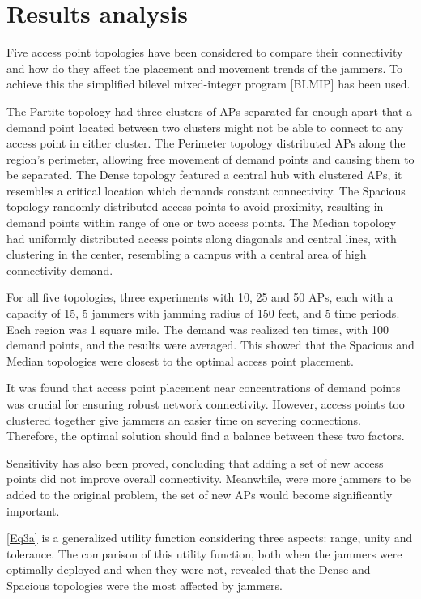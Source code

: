 \documentclass[runningheads]{llncs}
\begin{document}
\section{Results analysis}
	
	Five access point topologies have been considered to compare their connectivity and how do they affect the placement and movement trends of the jammers. To achieve this the simplified bilevel mixed-integer program [BLMIP] has been used.
	
	The Partite topology had three clusters of APs separated far enough apart that a demand point located between two clusters might not be able to connect to any access point in either cluster. The Perimeter topology distributed APs along the region's perimeter, allowing free movement of demand points and causing them to be separated. The Dense topology featured a central hub with clustered APs, it resembles a critical location which demands constant connectivity. The Spacious topology randomly distributed access points to avoid proximity, resulting in demand points within range of one or two access points. The Median topology had uniformly distributed access points along diagonals and central lines, with clustering in the center, resembling a campus with a central area of high connectivity demand.
	

	For all five topologies, three experiments with 10, 25 and 50 APs, each with a capacity of 15, 5 jammers with jamming radius of 150 feet, and 5 time periods. Each region was 1 square mile. The demand was realized ten times, with 100 demand points, and the results were averaged. This showed that the Spacious and Median topologies were closest to the optimal access point placement.
	
	It was found that access point placement near concentrations of demand points was crucial for ensuring robust network connectivity. However, access points too clustered together give jammers an easier time on severing connections. Therefore, the optimal solution should find a balance between these two factors. 
	
	Sensitivity has also been proved, concluding that adding a set of new access points did not improve overall connectivity. Meanwhile, were more jammers to be added to the original problem, the set of new APs would become significantly important.
	
	\ref{Eq3a} is a generalized utility function considering three aspects: range, unity and tolerance.
	 The comparison of this utility function, both when the jammers were optimally deployed and when they were not, revealed that the Dense and Spacious topologies were the most affected by jammers.
	
\end{document}
